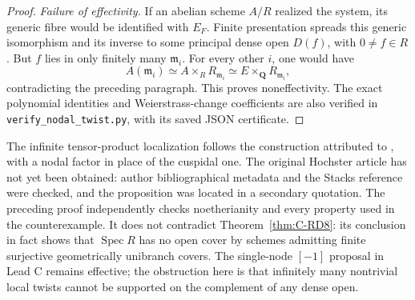 \begin{proof}
\emph{Failure of effectivity.} If an abelian scheme $A/R$ realized the
system, its generic fibre would be identified with $E_F$. Finite
presentation spreads this generic isomorphism and its inverse to
some principal dense open $D(f)$, with $0\ne f\in R$. But $f$ lies
in only finitely many $\mathfrak m_i$. For every other $i$, one would
have
\[
 A(\mathfrak m_i)\simeq A\times_RR_{\mathfrak m_i}
   \simeq E\times_{\mathbf Q}R_{\mathfrak m_i},
\]
contradicting the preceding paragraph. This proves noneffectivity. The exact polynomial identities and
Weierstrass-change coefficients are also verified in
\texttt{verify\_nodal\_twist.py}, with its saved JSON certificate.
\end{proof}

\begin{remark}
The infinite tensor-product localization follows the construction
attributed to \cite[Proposition~1 and Example~1]{Hochster1973Loci},
with a nodal factor in place of the cuspidal one. The original
Hochster article has not yet been obtained: author bibliographical
metadata and the Stacks reference were checked, and the proposition
was located in a secondary quotation. The preceding proof independently
checks noetherianity and every property used in the counterexample.
It does not contradict Theorem~\ref{thm:C-RD8}: its conclusion in fact
shows that $\operatorname{Spec}R$ has no open cover by schemes admitting
finite surjective geometrically unibranch covers. The single-node
$[-1]$ proposal in Lead C remains effective; the obstruction here is
that infinitely many nontrivial local twists cannot be supported on
the complement of any dense open.
\end{remark}

